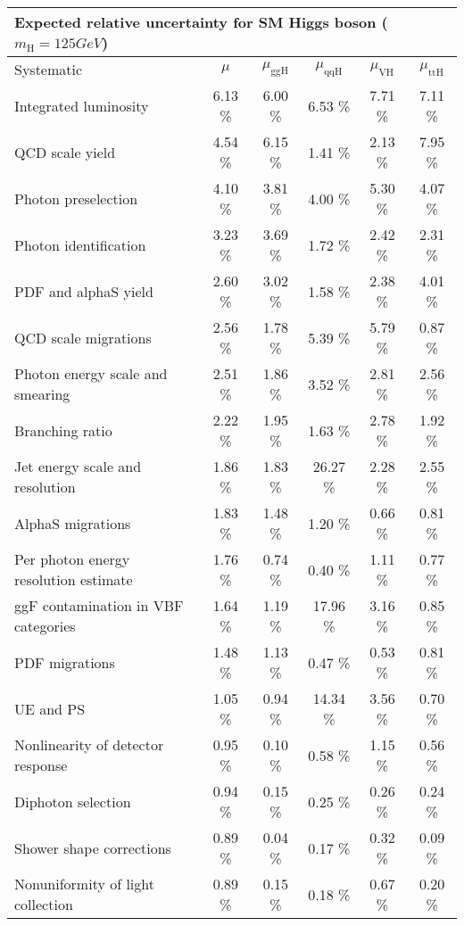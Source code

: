   \begin{tabular} { |l |  c |  c |  c |  c |  c |  }
  \hline
  \multicolumn{6}{|l|}{Expected relative uncertainty for SM Higgs boson ($m_{\text{H}} = 125 GeV $) } \\
  \hline
   Systematic    & $\mu$ & $\mu_{\text{ggH}}$ & $\mu_{\text{qqH}}$ & $\mu_{\text{VH}}$ & $\mu_{\text{ttH}}$ \\
   \hline
   Integrated luminosity  &  6.13 \% &  6.00 \% &  6.53 \% &  7.71 \% &  7.11 \% \\
   QCD scale yield  &  4.54 \% &  6.15 \% &  1.41 \% &  2.13 \% &  7.95 \% \\
   Photon preselection  &  4.10 \% &  3.81 \% &  4.00 \% &  5.30 \% &  4.07 \% \\
   Photon identification  &  3.23 \% &  3.69 \% &  1.72 \% &  2.42 \% &  2.31 \% \\
   PDF and alphaS yield  &  2.60 \% &  3.02 \% &  1.58 \% &  2.38 \% &  4.01 \% \\
   QCD scale migrations  &  2.56 \% &  1.78 \% &  5.39 \% &  5.79 \% &  0.87 \% \\
   Photon energy scale and smearing  &  2.51 \% &  1.86 \% &  3.52 \% &  2.81 \% &  2.56 \% \\
   Branching ratio  &  2.22 \% &  1.95 \% &  1.63 \% &  2.78 \% &  1.92 \% \\
   Jet energy scale and resolution  &  1.86 \% &  1.83 \% &  26.27 \% &  2.28 \% &  2.55 \% \\
   AlphaS migrations  &  1.83 \% &  1.48 \% &  1.20 \% &  0.66 \% &  0.81 \% \\
   Per photon energy resolution estimate  &  1.76 \% &  0.74 \% &  0.40 \% &  1.11 \% &  0.77 \% \\
   ggF contamination in VBF categories  &  1.64 \% &  1.19 \% &  17.96 \% &  3.16 \% &  0.85 \% \\
   PDF migrations  &  1.48 \% &  1.13 \% &  0.47 \% &  0.53 \% &  0.81 \% \\
   UE and PS  &  1.05 \% &  0.94 \% &  14.34 \% &  3.56 \% &  0.70 \% \\
   Nonlinearity of detector response  &  0.95 \% &  0.10 \% &  0.58 \% &  1.15 \% &  0.56 \% \\
   Diphoton selection  &  0.94 \% &  0.15 \% &  0.25 \% &  0.26 \% &  0.24 \% \\
   Shower shape corrections  &  0.89 \% &  0.04 \% &  0.17 \% &  0.32 \% &  0.09 \% \\
   Nonuniformity of light collection  &  0.89 \% &  0.15 \% &  0.18 \% &  0.67 \% &  0.20 \% \\

\end{tabular}
